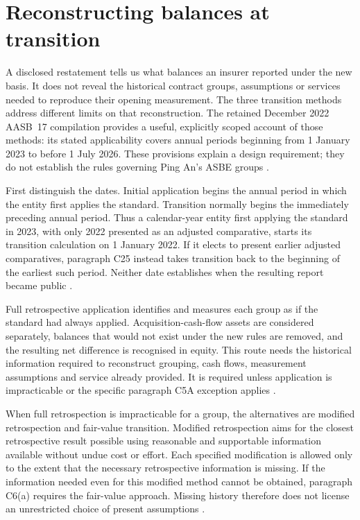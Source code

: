 \clearpage
\section{Reconstructing balances at transition}
\label{sec:insurance-transition}

A disclosed restatement tells us what balances an insurer reported under the
new basis. It does not reveal the historical contract groups, assumptions or
services needed to reproduce their opening measurement. The three transition
methods address different limits on that reconstruction. The retained
December 2022 AASB~17 compilation provides a useful, explicitly scoped account
of those methods: its stated applicability covers annual periods beginning
from 1 January 2023 to before 1 July 2026. These provisions explain a design
requirement; they do not establish the rules governing Ping An's ASBE groups
\citep[Appendix C]{aasb17}.

First distinguish the dates. Initial application begins the annual period in
which the entity first applies the standard. Transition normally begins the
immediately preceding annual period. Thus a calendar-year entity first applying
the standard in 2023, with only 2022 presented as an adjusted comparative,
starts its transition calculation on 1 January 2022. If it elects to present
earlier adjusted comparatives, paragraph C25 instead takes transition back to
the beginning of the earliest such period. Neither date establishes when the
resulting report became public \citep[paragraphs C2 and C25--C27]{aasb17}.

Full retrospective application identifies and measures each group as if the
standard had always applied. Acquisition-cash-flow assets are considered
separately, balances that would not exist under the new rules are removed, and
the resulting net difference is recognised in equity. This route needs the
historical information required to reconstruct grouping, cash flows,
measurement assumptions and service already provided. It is required unless
application is impracticable or the specific paragraph C5A exception applies
\citep[paragraphs C3--C5]{aasb17}.

When full retrospection is impracticable for a group, the alternatives are
modified retrospection and fair-value transition. Modified retrospection aims
for the closest retrospective result possible using reasonable and supportable
information available without undue cost or effort. Each specified modification
is allowed only to the extent that the necessary retrospective information is
missing. If the information needed even for this modified method cannot be
obtained, paragraph C6(a) requires the fair-value approach. Missing history
therefore does not license an unrestricted choice of present assumptions
\citep[paragraphs C5--C8]{aasb17}.

